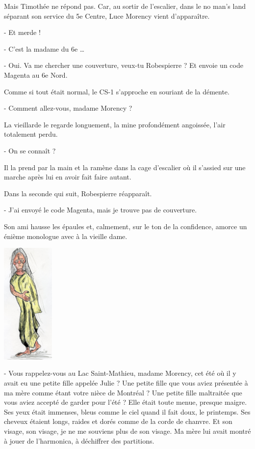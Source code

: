 Mais Timothée ne répond pas. Car, au sortir de l’escalier, dans le no man’s land séparant son service du 5e Centre, Luce Morency vient d’apparaître.

- Et merde !

- C’est la madame du 6e …

- Oui. Va me chercher une couverture, veux-tu Robespierre ? Et envoie un code Magenta au 6e Nord.

Comme si tout était normal, le CS-1 s’approche en souriant de la démente.

- Comment allez-vous, madame Morency ?

La vieillarde le regarde longuement, la mine profondément angoissée, l’air totalement perdu.

- On se connaît ?

Il la prend par la main et la ramène dans la cage d’escalier où il s’assied sur une marche après lui en avoir fait faire autant.

Dans la seconde qui suit, Robespierre réapparaît.

- J’ai envoyé le code Magenta, mais je trouve pas de couverture.

Son ami hausse les épaules et, calmement, sur le ton de la confidence, amorce un énième monologue avec à la vieille dame.

\begin{floatingfigure}[l]{30mm}
\includegraphics[height=60mm]{corps/chapitre14/img/personnage-morency.jpg}
\end{floatingfigure}

- Vous rappelez-vous au Lac Saint-Mathieu, madame Morency, cet été où il y avait eu une petite fille appelée Julie ? Une petite fille que vous aviez présentée à ma mère comme étant votre nièce de Montréal ? Une petite fille maltraitée que vous aviez accepté de garder pour l’été ? Elle était toute menue, presque maigre. Ses yeux était immenses, bleus comme le ciel quand il fait doux, le printemps. Ses cheveux étaient longs, raides et dorés comme de la corde de chanvre. Et son visage, son visage, je ne me souviens plus de son visage. Ma mère lui avait montré à jouer de l’harmonica, à déchiffrer des partitions.

